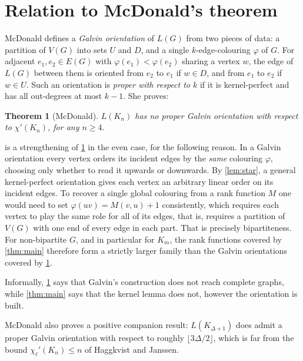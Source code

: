 \documentclass[11pt]{article}
\numberwithin{equation}{section}
\theoremstyle{plain}
\newtheorem{theorem}{Theorem}[section]
\newcommand{\chpl}{\chi_{\ell}'}
\newcommand{\LG}{L}
\begin{document}
\section{Relation to McDonald's theorem}\label{sec:mcdonald}

McDonald defines a \emph{Galvin orientation} of $\LG(G)$ from two pieces of data: a partition
of $V(G)$ into sets $U$ and $D$, and a single $k$-edge-colouring $\varphi$ of $G$. For
adjacent $e_1,e_2\in E(G)$ with $\varphi(e_1)<\varphi(e_2)$ sharing a vertex $w$, the edge of
$\LG(G)$ between them is oriented from $e_2$ to $e_1$ if $w\in D$, and from $e_1$ to $e_2$ if
$w\in U$. Such an orientation is \emph{proper with respect to $k$} if it is kernel-perfect and
has all out-degrees at most $k-1$. She proves:

\begin{theorem}[McDonald]\label{thm:mcdonald}
$\LG(K_n)$ has no proper Galvin orientation with respect to $\chi'(K_n)$, for any $n\ge 4$.
\end{theorem}

 is a strengthening of \cref{thm:mcdonald} in the even case, for the following
reason. In a Galvin orientation every vertex orders its incident edges by the \emph{same}
colouring $\varphi$, choosing only whether to read it upwards or downwards. By
\cref{lem:star}, a general kernel-perfect orientation gives each vertex an arbitrary linear
order on its incident edges. To recover a single global colouring from a rank function $M$
one would need to set $\varphi(uv)=M(v,u)+1$ consistently, which requires each vertex to play
the same role for all of its edges, that is, requires a partition of $V(G)$ with one end of
every edge in each part. That is precisely bipartiteness. For non-bipartite $G$, and in
particular for $K_m$, the rank functions covered by \cref{thm:main} therefore form a strictly
larger family than the Galvin orientations covered by \cref{thm:mcdonald}.

Informally, \cref{thm:mcdonald} says that Galvin's construction does not reach complete
graphs, while \cref{thm:main} says that the kernel lemma does not, however the orientation is
built.

McDonald also proves a positive companion result: $\LG(K_{\Delta+1})$ does admit a proper
Galvin orientation with respect to roughly $\lfloor 3\Delta/2\rfloor$, which is far from the
bound $\chpl(K_n)\le n$ of Haggkvist and Janssen.
\end{document}
